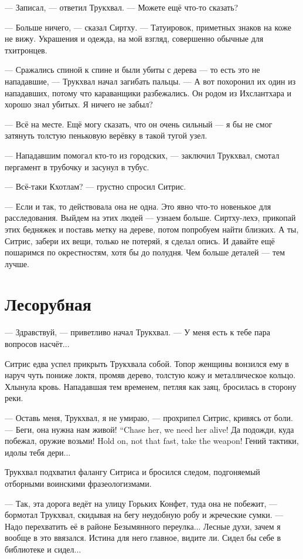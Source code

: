 --- Записал, --- ответил Трукхвал.
--- Можете ещё что-то сказать?

--- Больше ничего, --- сказал Сиртху.
--- Татуировок, приметных знаков на коже не вижу.
Украшения и одежда, на мой взгляд, совершенно обычные для тхитронцев.

--- Сражались спиной к спине и были убиты с дерева --- то есть это не нападавшие, --- Трукхвал начал загибать пальцы.
--- А вот похоронил их один из нападавших, потому что караванщики разбежались.
Он родом из Ихслантхара и хорошо знал убитых.
Я ничего не забыл?

--- Всё на месте.
Ещё могу сказать, что он очень сильный --- я бы не смог затянуть толстую пеньковую верёвку в такой тугой узел.

--- Нападавшим помогал кто-то из городских, --- заключил Трукхвал, смотал пергамент в трубочку и засунул в тубус.

--- Всё-таки Кхотлам? --- грустно спросил Ситрис.

--- Если и так, то действовала она не одна.
Это явно что-то новенькое для расследования.
Выйдем на этих людей --- узнаем больше.
Сиртху-лехэ, прикопай этих бедняжек и поставь метку на дереве, потом попробуем найти близких.
А ты, Ситрис, забери их вещи, только не потеряй, я сделал опись.
И давайте ещё пошаримся по окрестностям, хотя бы до полудня.
Чем больше деталей --- тем лучше.

\section{Лесорубная}

--- Здравствуй, --- приветливо начал Трукхвал.
--- У меня есть к тебе пара вопросов насчёт...

Ситрис едва успел прикрыть Трукхвала собой.
Топор женщины вонзился ему в наруч чуть пониже локтя, промяв дерево, толстую кожу и металлическое кольцо.
Хлынула кровь.
Нападавшая тем временем, петляя как заяц, бросилась в сторону реки.

--- Оставь меня, Трукхвал, я не умираю, --- прохрипел Ситрис, кривясь от боли.
{--- Беги, она нужна нам живой!}
{``Chase her, we need her alive!}
{Да подожди, куда побежал, оружие возьми!}
{Hold on, not that fast, take the weapon!}
Гений тактики, идолы тебя дери...

Трукхвал подхватил фалангу Ситриса и бросился следом, подгоняемый отборными воинскими фразеологизмами.

--- Так, эта дорога ведёт на улицу Горьких Конфет, туда она не побежит, --- бормотал Трукхвал, скидывая на бегу неудобную робу и жреческие сумки.
--- Надо перехватить её в районе Безымянного переулка...
Лесные духи, зачем я вообще в это ввязался.
Истина для него главное, видите ли.
Сидел бы себе в библиотеке и сидел...

